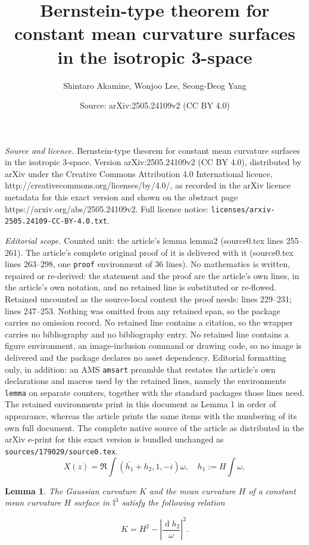 \documentclass[10pt,a4paper]{amsart}
\title{Bernstein-type theorem for constant mean curvature surfaces in the isotropic 3-space}
\author{Shintaro Akamine, Wonjoo Lee, Seong-Deog Yang}
\date{Source: arXiv:2505.24109v2 (CC BY 4.0)}
\newtheorem{lemma}{Lemma}
\begin{document}
\maketitle

\noindent\emph{Source and licence.} Bernstein-type theorem for constant mean curvature surfaces in the isotropic 3-space. Version arXiv:2505.24109v2 (CC BY 4.0), distributed by arXiv under the Creative Commons Attribution 4.0 International licence, http://creativecommons.org/licenses/by/4.0/, as recorded in the arXiv licence metadata for this exact version and shown on the abstract page https://arxiv.org/abs/2505.24109v2. Full licence notice: \texttt{licenses/arxiv-2505.24109-CC-BY-4.0.txt}.\par\smallskip

\noindent\textit{Editorial scope.} Counted unit: the article's lemma lemma2 (source0.tex lines 255--261). The article's complete original proof of it is delivered with it (source0.tex lines 263--298, one \texttt{proof} environment of 36 lines). No mathematics is written, repaired or re-derived: the statement and the proof are the article's own lines, in the article's own notation, and no retained line is substituted or re-flowed.  Retained uncounted as the source-local context the proof needs: lines 229--231; lines 247--253.  Nothing was omitted from any retained span, so the package carries no omission record.  No retained line contains a citation, so the wrapper carries no bibliography and no bibliography entry.  No retained line contains a figure environment, an image-inclusion command or drawing code, so no image is delivered and the package declares no asset dependency.  Editorial formatting only, in addition: an AMS \texttt{amsart} preamble that restates the article's own declarations and macros used by the retained lines, namely the environments \texttt{lemma} on separate counters, together with the standard packages those lines need.  The retained environments print in this document as Lemma 1 in order of appearance, whereas the article prints the same items with the numbering of its own full document.  The complete native source of the article as distributed in the arXiv e-print for this exact version is bundled unchanged as \texttt{sources/179029/source0.tex}.
	\begin{equation}\label{eq:Wformula}
	X(z)= \Re \int \left(\overline{h_1}+h_2, 1, -i\right)\omega, \quad h_1:=H\int \omega,
	\end{equation}

\begin{lemma}\label{lemma}
The Gaussian curvature $K$ and the mean curvature $H$ of a constant mean curvature $H$ surface in $\mathbb{I}^3$ satisfy the following relation

	\begin{equation}\label{eq:KH}
	K=H^2-\left| \frac{\operatorname{d}\!h_2}{\omega} \right|^2.
	\end{equation}
\end{lemma}
\end{document}
